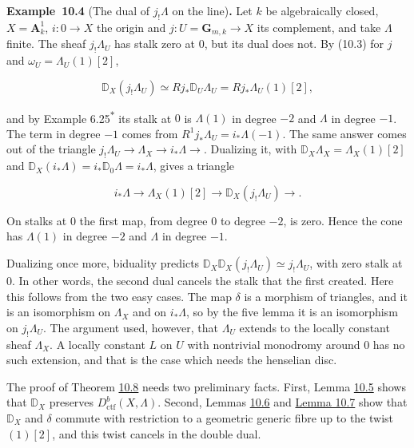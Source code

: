 \documentclass[11pt]{article}
\newenvironment{bpstatement}[2]{\par\addvspace{0.6\baselineskip}\noindent\textbf{#1}#2\textbf{.}\enspace\ignorespaces}
  {\par\addvspace{0.4\baselineskip}}
\newcommand{\bpout}[1]{#1\textsuperscript{\hyperlink{bp-outside}{\ensuremath{\ast}}}}
\begin{document}
\label{bp14}%
\begin{bpstatement}{Example~10.4}{ (The dual of $j_!\Lambda$ on the line)}
Let \(k\) be algebraically closed, \(X=\mathbf A^1_k\), \(i:0\to X\) the origin and \(j:U=\mathbf G_{m,k}\to X\) its complement, and take \(\Lambda\) finite. The sheaf \(j_!\Lambda_U\) has stalk zero at \(0\), but its dual does not. By (10.3) for \(j\) and \(\omega_U=\Lambda_U(1)[2]\),

\[
\mathbb D_X(j_!\Lambda_U)\simeq Rj_*\mathbb D_U\Lambda_U
=Rj_*\Lambda_U(1)[2],
\]

and by Example \bpout{6.25} its stalk at \(0\) is \(\Lambda(1)\) in degree \(-2\) and \(\Lambda\) in degree \(-1\). The term in degree \(-1\) comes from \(R^1j_*\Lambda_U=i_*\Lambda(-1)\). The same answer comes out of the triangle \(j_!\Lambda_U\to\Lambda_X\to i_*\Lambda\to\). Dualizing it, with \(\mathbb D_X\Lambda_X=\Lambda_X(1)[2]\) and \(\mathbb D_X(i_*\Lambda)=i_*\mathbb D_0\Lambda=i_*\Lambda\), gives a triangle

\[
i_*\Lambda\longrightarrow\Lambda_X(1)[2]\longrightarrow
\mathbb D_X(j_!\Lambda_U)\longrightarrow.
\]

On stalks at \(0\) the first map, from degree \(0\) to degree \(-2\), is zero. Hence the cone has \(\Lambda(1)\) in degree \(-2\) and \(\Lambda\) in degree \(-1\).

Dualizing once more, biduality predicts \(\mathbb D_X\mathbb D_X(j_!\Lambda_U)
\simeq j_!\Lambda_U\), with zero stalk at \(0\). In other words, the second dual cancels the stalk that the first created. Here this follows from the two easy cases. The map \(\delta\) is a morphism of triangles, and it is an isomorphism on \(\Lambda_X\) and on \(i_*\Lambda\), so by the five lemma it is an isomorphism on \(j_!\Lambda_U\). The argument used, however, that \(\Lambda_U\) extends to the locally constant sheaf \(\Lambda_X\). A locally constant \(L\) on \(U\) with nontrivial monodromy around \(0\) has no such extension, and that is the case which needs the henselian disc.
\end{bpstatement}

\label{bp15}%
The proof of Theorem \hyperref[bp25]{10.8} needs two preliminary facts. First, Lemma \hyperref[bp16]{10.5} shows that \(\mathbb D_X\) preserves \(D^b_{\mathrm{ctf}}(X,\Lambda)\). Second, Lemmas \hyperref[bp19]{10.6} and \hyperref[bp22]{Lemma 10.7} show that \(\mathbb D_X\) and \(\delta\) commute with restriction to a geometric generic fibre up to the twist \((1)[2]\), and this twist cancels in the double dual.
\end{document}
